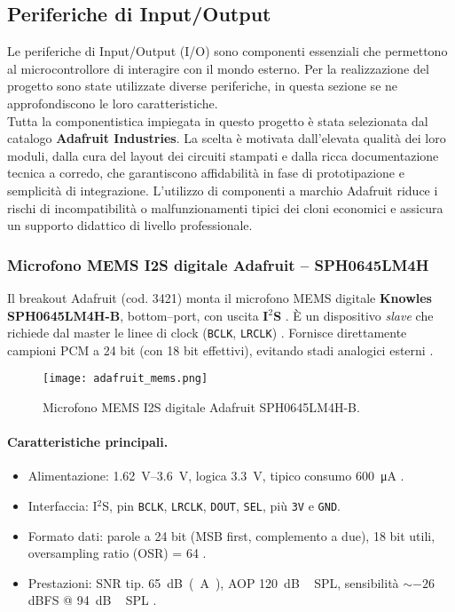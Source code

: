 \subsection{Periferiche di Input/Output}
Le periferiche di Input/Output (I/O) sono componenti essenziali che permettono al microcontrollore di interagire con il mondo esterno.
Per la realizzazione del progetto sono state utilizzate diverse periferiche, in questa sezione se ne approfondiscono le loro caratteristiche.\\
\noindent
Tutta la componentistica impiegata in questo progetto è stata selezionata dal catalogo \textbf{Adafruit Industries}. 
La scelta è motivata dall'elevata qualità dei loro moduli, dalla cura del layout dei circuiti stampati e dalla ricca documentazione tecnica a corredo, che garantiscono affidabilità in fase di prototipazione e semplicità di integrazione. 
L'utilizzo di componenti a marchio Adafruit riduce i rischi di incompatibilità o malfunzionamenti tipici dei cloni economici e assicura un supporto didattico di livello professionale.


\subsubsection{Microfono MEMS I2S digitale Adafruit -- SPH0645LM4H}
\label{subsec:mic}
Il breakout Adafruit (cod. 3421) monta il microfono MEMS digitale \textbf{Knowles SPH0645LM4H-B}, bottom–port, con uscita \textbf{I$^2$S} \citep{adafruit-guide,adafruit-product}. 
È un dispositivo \emph{slave} che richiede dal master le linee di clock (\texttt{BCLK}, \texttt{LRCLK}) \citep{nordic-devzone}. 
Fornisce direttamente campioni PCM a 24 bit (con 18 bit effettivi), evitando stadi analogici esterni \citep{knowles-datasheet}.
\begin{figure}[H]
  \centering
  \texttt{[image: adafruit\_mems.png]}
  \caption{Microfono MEMS I2S digitale Adafruit SPH0645LM4H-B.}
  \label{fig:adafruit_mems}
  \end{figure}

\paragraph{Caratteristiche principali.}
\begin{itemize}
  \item Alimentazione: \SIrange{1.62}{3.6}{V}, logica \SI{3.3}{V}, tipico consumo \SI{600}{\micro A} \citep{digikey-sheet}.
  \item Interfaccia: I$^2$S, pin \texttt{BCLK}, \texttt{LRCLK}, \texttt{DOUT}, \texttt{SEL}, più \texttt{3V} e \texttt{GND}.
  \item Formato dati: parole a 24 bit (MSB first, complemento a due), 18 bit utili, oversampling ratio (OSR) = 64 \citep{knowles-datasheet}.
  \item Prestazioni: SNR tip. \SI{65}{dB(A)}, AOP \SI{120}{dB\,SPL}, sensibilità $\sim -26$ dBFS @ \SI{94}{dB\,SPL} \citep{knowles-datasheet}.
\end{itemize}

